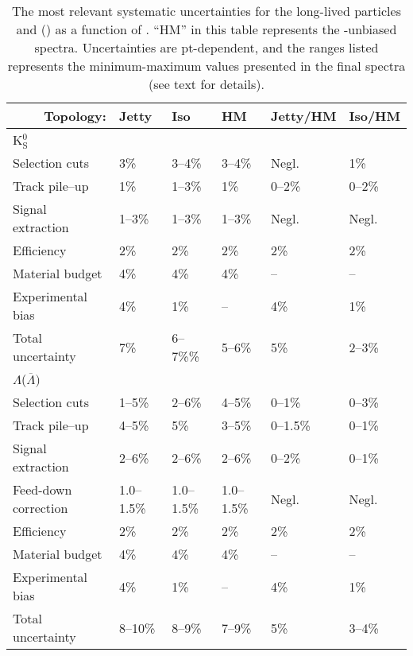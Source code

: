 \begin{table}[h!]
\centering
\caption{The most relevant systematic uncertainties for the long-lived particles \KOs and \LA(\AL) as a function of \SOPT. ``HM'' in this table represents the \SOPT-unbiased spectra. Uncertainties are pt-dependent, and the ranges listed represents the minimum-maximum values presented in the final spectra (see text for details). }
\label{tab:sphero:syst}
\begin{tabular}{|l|lllll|}
\hline
\multicolumn{1}{|r|}{Topology:}              & Jetty     & Iso       & HM        & Jetty/HM       & Iso/HM      \\ \hline

\multicolumn{6}{l}{\parbox[b][1.2em]{1em}{K$^0_\mathrm{S}$}} \\
\hline
Selection cuts        & 3\%    & 3--4\%     & 3--4\%     & Negl.          & 1\%          \\
Track pile--up        & 1\% & 1--3\% & 1\% & 0--2\% & 0--2\%   \\
Signal extraction     & 1--3\%     & 1--3\%     & 1--3\%     & Negl. & Negl. \\
Efficiency            & 2\%    & 2\%    & 2\%    & 2\%         & 2\%         \\
Material budget       & 4\%    & 4\%    & 4\%    & --              & --              \\
Experimental bias     & 4\%    & 1\%    & --         & 4\%         & 1\%         \\ \hline
Total uncertainty     & 7\%    & 6--7\%\%   & 5--6\%     & 5\%         & 2--3\%          \\ \hline
\multicolumn{6}{l}{\parbox[b][1.2em]{1em}{$\Lambda$($\overline{\Lambda})$}} \\
\hline
Selection cuts & 1--5\%     & 2--6\%     & 4--5\%     & 0--1\%          & 0--3\%          \\
Track pile--up        & 4--5\% & 5\% & 3--5\% & 0--1.5\% & 0--1\%   \\
Signal extraction     & 2--6\%     & 2--6\%     & 2--6\%     & 0--2\%          & 0--1\%          \\
Feed-down correction   & 1.0--1.5\% & 1.0--1.5\% & 1.0--1.5\% & Negl. & Negl. \\
Efficiency            & 2\%    & 2\%    & 2\%    & 2\%         & 2\%         \\
Material budget       & 4\%    & 4\%    & 4\%    & --              & --              \\
Experimental bias     & 4\%    & 1\%    & --         & 4\%         & 1\%         \\ \hline
Total uncertainty     & 8--10\%    & 8--9\%     & 7--9\%     & 5\%         & 3--4\%          \\ \hline
\end{tabular}
\end{table}

